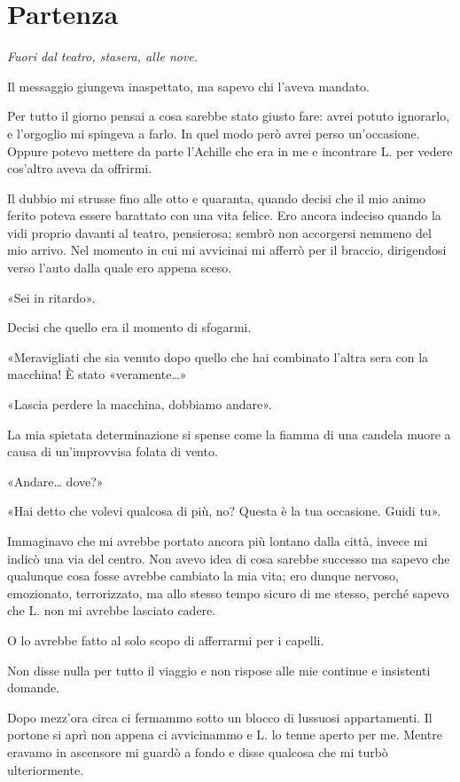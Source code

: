 \chapter{Partenza}
\label{ch:partenza}

\emph{Fuori dal teatro, stasera, alle nove.}

Il messaggio giungeva inaspettato, ma sapevo chi l'aveva mandato.

Per tutto il giorno pensai a cosa sarebbe stato giusto fare: avrei potuto ignorarlo, e l'orgoglio mi
spingeva a farlo. In quel modo però avrei perso un'occasione. Oppure potevo mettere da parte
l'Achille che era in me e incontrare L. per vedere cos'altro aveva da offrirmi.

Il dubbio mi strusse fino alle otto e quaranta, quando decisi che il mio animo ferito poteva essere
barattato con una vita felice. Ero ancora indeciso quando la vidi proprio davanti al teatro,
pensierosa; sembrò non accorgersi nemmeno del mio arrivo. Nel momento in cui mi avvicinai mi afferrò
per il braccio, dirigendosi verso l'auto dalla quale ero appena sceso.

«Sei in ritardo».

Decisi che quello era il momento di sfogarmi.

«Meravigliati che sia venuto dopo quello che hai combinato l'altra sera con la macchina! È stato
«veramente\dots{}»

«Lascia perdere la macchina, dobbiamo andare».

La mia spietata determinazione si spense come la fiamma di una candela muore a causa di
un'improvvisa folata di vento.

«Andare\dots{} dove?»

«Hai detto che volevi qualcosa di più, no? Questa è la tua occasione. Guidi tu».

Immaginavo che mi avrebbe portato ancora più lontano dalla città, invece mi indicò una via del
centro. Non avevo idea di cosa sarebbe successo ma sapevo che qualunque cosa fosse avrebbe cambiato
la mia vita; ero dunque nervoso, emozionato, terrorizzato, ma allo stesso tempo sicuro di me stesso,
perché sapevo che L. non mi avrebbe lasciato cadere.

O lo avrebbe fatto al solo scopo di afferrarmi per i capelli.

Non disse nulla per tutto il viaggio e non rispose alle mie continue e insistenti domande.

Dopo mezz'ora circa ci fermammo sotto un blocco di lussuosi appartamenti. Il portone si aprì non
appena ci avvicinammo e L. lo tenne aperto per me. Mentre eravamo in ascensore mi guardò a fondo e
disse qualcosa che mi turbò ulteriormente.

